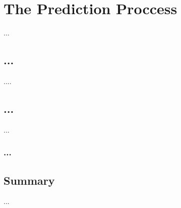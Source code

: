 \chapter{The Prediction Proccess}
\label{prediction-process}

...
\section{...}
....


\section{...}
...


\subsection{...}


\section{Summary}
...


